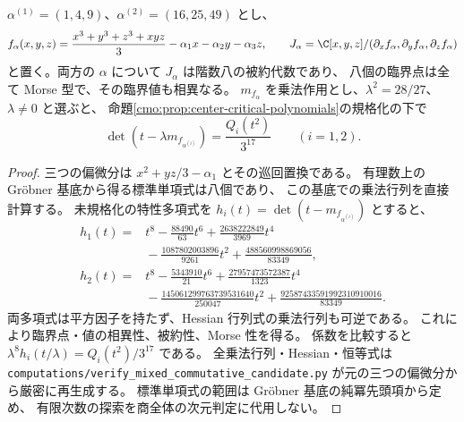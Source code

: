 \begin{proposition}
\label{cmo:prop:commutative-critical-spectrum}
$\alpha^{(1)}=(1,4,9)$、$\alpha^{(2)}=(16,25,49)$ とし、
\[
 f_\alpha(x,y,z)=\frac{x^3+y^3+z^3+xyz}{3}
                 -\alpha_1x-\alpha_2y-\alpha_3z,\qquad
 J_\alpha=\C[x,y,z]/(\partial_xf_\alpha,\partial_yf_\alpha,\partial_zf_\alpha)
\]
と置く。両方の $\alpha$ について $J_\alpha$ は階数八の被約代数であり、
八個の臨界点は全て Morse 型で、その臨界値も相異なる。
$m_{f_\alpha}$ を乗法作用とし、$\lambda^2=28/27$、$\lambda\ne0$ と選ぶと、
命題\ref{cmo:prop:center-critical-polynomials}の規格化の下で
\begin{equation}\label{cmo:eq:commutative-critical-spectrum}
 \det(t-\lambda m_{f_{\alpha^{(i)}}})
    =\frac{Q_i(t^2)}{3^{17}}\qquad(i=1,2).
\end{equation}
\end{proposition}
\begin{proof}
三つの偏微分は
$x^2+yz/3-\alpha_1$ とその巡回置換である。
有理数上の Gröbner 基底から得る標準単項式は八個であり、
この基底での乗法行列を直接計算する。
未規格化の特性多項式を $h_i(t)=\det(t-m_{f_{\alpha^{(i)}}})$ とすると、
\begin{align*}
 h_1(t)={}&t^8-\frac{88490}{63}t^6
 +\frac{2638222849}{3969}t^4\\
 &{}-\frac{1087802003896}{9261}t^2
 +\frac{488560998869056}{83349},\\
 h_2(t)={}&t^8-\frac{5343910}{21}t^6
 +\frac{27957473572387}{1323}t^4\\
 &{}-\frac{145061299763739531640}{250047}t^2
 +\frac{92587433591992310910016}{83349}.
\end{align*}
両多項式は平方因子を持たず、Hessian 行列式の乗法行列も可逆である。
これにより臨界点・値の相異性、被約性、Morse 性を得る。
係数を比較すると
$\lambda^8h_i(t/\lambda)=Q_i(t^2)/3^{17}$ である。
全乗法行列・Hessian・恒等式は
\texttt{computations/verify\_mixed\_commutative\_candidate.py}
が元の三つの偏微分から厳密に再生成する。
標準単項式の範囲は Gröbner 基底の純冪先頭項から定め、
有限次数の探索を商全体の次元判定に代用しない。
\end{proof}

